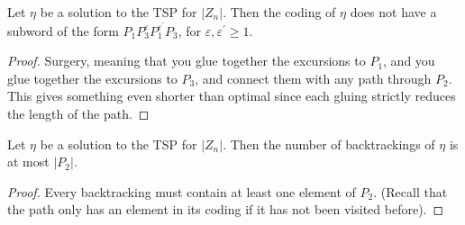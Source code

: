 \begin{lem}\label{lem: groceries lemma p1p3p1p3}
	Let $\eta$ be a solution to the TSP for $|Z_n|$. Then the coding of $\eta$ does not have a subword of the form $P_1P_3^{\varepsilon}P_1^{\varepsilon^{\prime }}P_3$, for $\varepsilon, \varepsilon^{\prime}\ge 1$.
\end{lem}
\begin{proof}
	Surgery, meaning that you glue together the excursions to $P_1$, and you glue together the excursions to $P_3$, and connect them with any path through $P_2$. This gives something even shorter than optimal since each gluing strictly reduces the length of the path.
\end{proof}

\begin{cor}\label{cor: number of backtrackings}
	Let $\eta$ be a solution to the TSP for $|Z_n|$. Then the number of backtrackings of $\eta$ is at most $|P_2|$.
\end{cor}
\begin{proof}
	Every backtracking must contain at least one element of $P_2$. (Recall that the path only has an element in its coding if it has not been visited before).
\end{proof}


